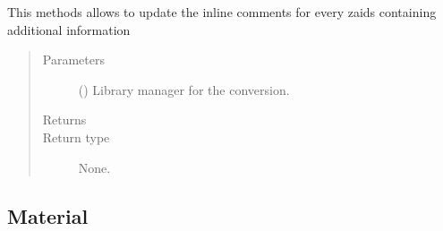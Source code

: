 \documentclass[letterpaper,10pt,english]{sphinxmanual}
\begin{document}
\begin{fulllineitems}
\begin{fulllineitems}
\label{\detokenize{api/inputgeneration:matreader.MatCardsList.update_info}}
\sphinxAtStartPar
This methods allows to update the in\sphinxhyphen{}line comments for every zaids
containing additional information
\begin{quote}\begin{description}
\item[{Parameters}] \leavevmode
\sphinxAtStartPar
{} () \textendash{} Library manager for the conversion.

\item[{Returns}] \leavevmode
\sphinxAtStartPar


\item[{Return type}] \leavevmode
\sphinxAtStartPar
None.

\end{description}\end{quote}

\end{fulllineitems}


\end{fulllineitems}



\subsection{Material}
\label{\detokenize{api/inputgeneration:material}}
\end{document}
